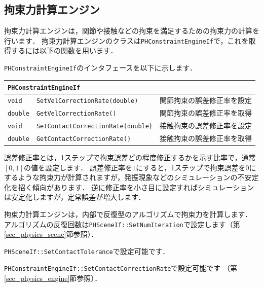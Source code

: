 \subsection*{\KLUDGE 拘束力計算エンジン}

\KLUDGE 拘束力計算エンジンは，関節や接触などの拘束を満足するための拘束力の計算を行います．
\KLUDGE 拘束力計算エンジンのクラスは\texttt{PHConstraintEngineIf}\KLUDGE で，これを取得するには以下の関数を用います．


\texttt{PHConstraintEngineIf}\KLUDGE のインタフェースを以下に示します．

\begin{center}
\begin{longtable}{p{.12\hsize}p{.45\hsize}p{.33\hsize}}
\multicolumn{3}{l}{\texttt{PHConstraintEngineIf}}			\\ \midrule
\texttt{void}	& \texttt{SetVelCorrectionRate(double)}		& \KLUDGE 関節拘束の誤差修正率を設定 \\
\texttt{double} & \texttt{GetVelCorrectionRate()}			& \KLUDGE 関節拘束の誤差修正率を取得 \\
\texttt{void}	& \texttt{SetContactCorrectionRate(double)}	& \KLUDGE 接触拘束の誤差修正率を設定 \\
\texttt{double} & \texttt{GetContactCorrectionRate()}		& \KLUDGE 接触拘束の誤差修正率を取得 \\
\end{longtable}
\end{center}

\KLUDGE 誤差修正率とは，1\KLUDGE ステップで拘束誤差どの程度修正するかを示す比率で，通常$[0, 1]$\KLUDGE の値を設定します．
\KLUDGE 誤差修正率を$1$\KLUDGE にすると，1\KLUDGE ステップで拘束誤差を$0$\KLUDGE にするような拘束力が計算されますが，発振現象などのシミュレーションの不安定化を招く傾向があります．
\KLUDGE 逆に修正率を小さ目に設定すればシミュレーションは安定化しますが，定常誤差が増大します．

\KLUDGE 拘束力計算エンジンは，内部で反復型のアルゴリズムで拘束力を計算します．
\KLUDGE アルゴリズムの反復回数は\texttt{PHSceneIf::SetNumIteration}\KLUDGE で設定します（第\ref{sec_physics_scene}\KLUDGE 節参照）．


\texttt{PHSceneIf::SetContactTolerance}\KLUDGE で設定可能です．

\texttt{PHConstraintEngineIf::SetContactCorrectionRate}\KLUDGE で設定可能です
\KLUDGE （第\ref{sec_physics_engine}\KLUDGE 節参照）．
